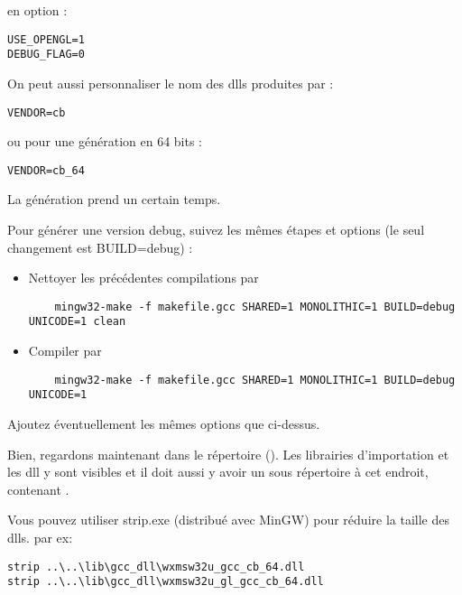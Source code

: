 en option :
\begin{verbatim}
USE_OPENGL=1
DEBUG_FLAG=0
\end{verbatim}


On peut aussi personnaliser le nom des dlls produites par :
\begin{verbatim}
VENDOR=cb
\end{verbatim}
ou pour une génération en 64 bits :
\begin{verbatim}
VENDOR=cb_64
\end{verbatim}


La génération prend un certain temps.

Pour générer une version debug, suivez les mêmes étapes et options (le seul changement est BUILD=debug) :

\begin{itemize}
\item Nettoyer les précédentes compilations par
	\begin{verbatim}
	mingw32-make -f makefile.gcc SHARED=1 MONOLITHIC=1 BUILD=debug UNICODE=1 clean
	\end{verbatim}
\item Compiler par
	\begin{verbatim}
	mingw32-make -f makefile.gcc SHARED=1 MONOLITHIC=1 BUILD=debug UNICODE=1
	\end{verbatim}
\end{itemize}

Ajoutez éventuellement les mêmes options que ci-dessus.

Bien, regardons maintenant dans le répertoire (). Les librairies d'importation et les dll y sont visibles et il doit aussi y avoir un sous répertoire  à cet endroit, contenant .

Vous pouvez utiliser strip.exe (distribué avec MinGW) pour réduire la taille des dlls.
par ex:
\begin{verbatim}
strip ..\..\lib\gcc_dll\wxmsw32u_gcc_cb_64.dll
strip ..\..\lib\gcc_dll\wxmsw32u_gl_gcc_cb_64.dll
\end{verbatim}

